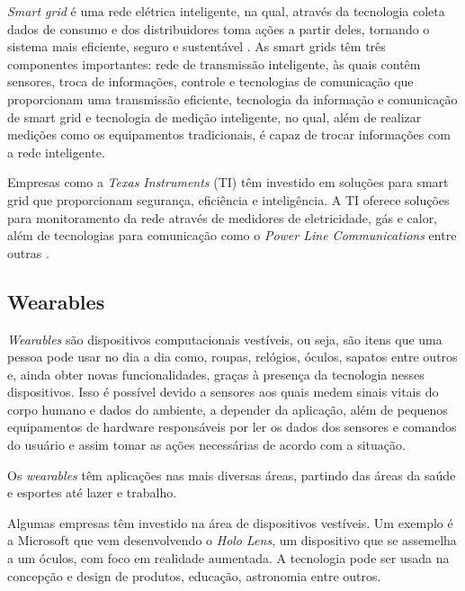\textit{Smart grid} é uma rede elétrica inteligente, na qual, através da tecnologia coleta dados de 
consumo e dos distribuidores toma ações a partir deles, tornando o sistema mais eficiente, seguro 
e sustentável \cite{Cecilia2016}. As smart grids têm três componentes importantes: rede de 
transmissão inteligente, às quais contêm sensores, troca de informações, controle e tecnologias de 
comunicação que proporcionam uma transmissão eficiente, tecnologia da informação e comunicação de 
smart grid  e tecnologia de medição inteligente, no qual, além de realizar medições como os 
equipamentos tradicionais, é capaz de trocar informações com a rede inteligente. 

Empresas como a \textit{Texas Instruments} (TI) têm investido em soluções para smart grid que 
proporcionam segurança, eficiência e inteligência. A TI oferece soluções para monitoramento da rede 
através de medidores de eletricidade, gás e calor, além de tecnologias para comunicação como o 
\textit{Power Line Communications} entre outras \cite{texasinstruments2017}.


\subsection{Wearables}

\textit{Wearables} são dispositivos computacionais vestíveis, ou seja, são itens que uma pessoa pode usar no dia a dia como, roupas, relógios, óculos, sapatos entre outros e, ainda obter novas funcionalidades, graças à presença da tecnologia nesses dispositivos. Isso é possível devido a sensores aos quais medem sinais vitais do corpo humano e dados do ambiente, a depender da aplicação, além de pequenos equipamentos de hardware responsáveis por ler os dados dos sensores e comandos do usuário e assim tomar as ações necessárias de acordo com a situação.

Os \textit{wearables} têm aplicações nas mais diversas áreas, partindo das áreas da saúde e esportes até lazer e trabalho. 

Algumas empresas têm investido na área de dispositivos vestíveis. Um exemplo é a Microsoft que vem desenvolvendo o \textit{Holo Lens}, um dispositivo que se assemelha a um óculos, com foco em realidade aumentada. A tecnologia pode ser usada na concepção e design de produtos, educação, astronomia entre outros.

